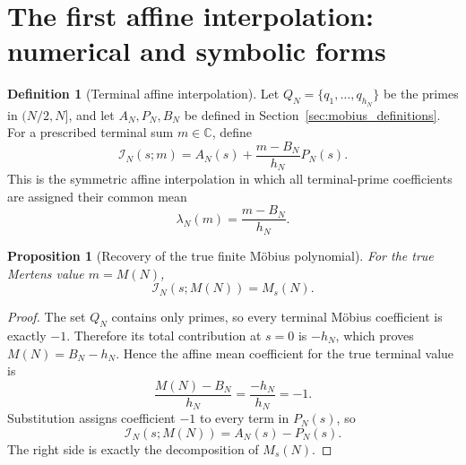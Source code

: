 \documentclass[11pt]{amsart}
\numberwithin{equation}{section}
\theoremstyle{plain}
\newtheorem{proposition}[theorem]{Proposition}
\theoremstyle{definition}
\newtheorem{definition}[theorem]{Definition}
\theoremstyle{remark}
\newcommand{\1}{\mathbf{1}}
\begin{document}
\section{The first affine interpolation: numerical and symbolic forms}
\label{sec:first_affine_interpolation}

\begin{definition}[Terminal affine interpolation]
\label{def:terminal_affine_interpolation}
Let \(Q_N=\{q_1,\ldots,q_{h_N}\}\) be the primes in \((N/2,N]\), and
let \(A_N,P_N,B_N\) be defined in Section~\ref{sec:mobius_definitions}.
For a prescribed terminal sum \(m\in\mathbb C\), define
\begin{equation}
\boxed{
\mathcal I_N(s;m)
=
A_N(s)+\frac{m-B_N}{h_N}P_N(s).
}
\label{eq:terminal_affine_interpolation}
\end{equation}
This is the symmetric affine interpolation in which all terminal-prime
coefficients are assigned their common mean
\begin{equation}
\lambda_N(m)=\frac{m-B_N}{h_N}.
\label{eq:terminal_mean_coefficient}
\end{equation}
\end{definition}

\begin{proposition}[Recovery of the true finite Möbius polynomial]
\label{prop:true_terminal_value}
For the true Mertens value \(m=M(N)\),
\begin{equation}
\mathcal I_N(s;M(N))
=
M_s(N).
\label{eq:true_terminal_interpolation}
\end{equation}
\end{proposition}

\begin{proof}
The set \(Q_N\) contains only primes, so every terminal Möbius coefficient
is exactly \(-1\).  Therefore its total contribution at \(s=0\) is
\(-h_N\), which proves \(M(N)=B_N-h_N\).  Hence the affine mean coefficient
for the true terminal value is
\begin{equation}
\frac{M(N)-B_N}{h_N}
=
\frac{-h_N}{h_N}
=-1.
\label{eq:true_terminal_mean_proof_detailed}
\end{equation}
Substitution assigns coefficient \(-1\) to every term in \(P_N(s)\), so
\begin{equation}
\mathcal I_N(s;M(N))
=
A_N(s)-P_N(s).
\label{eq:true_terminal_interpolation_proof_detailed}
\end{equation}
The right side is exactly the decomposition of \(M_s(N)\).
\end{proof}
\end{document}
